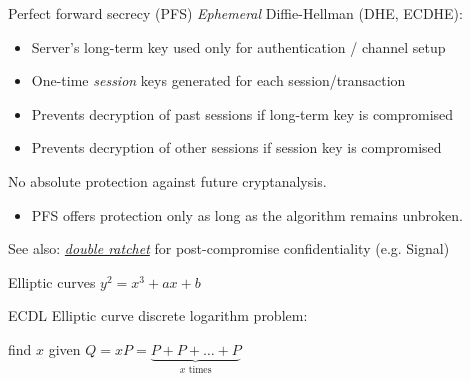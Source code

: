 \begin{frame}{Perfect forward secrecy (PFS)}
  \emph{Ephemeral} Diffie-Hellman (DHE, ECDHE):
  \begin{itemize}[<+(1)->]
    \item Server's long-term key used only for authentication / channel setup
    \item One-time \emph{session} keys generated for each session/transaction
    \item Prevents decryption of past sessions if  long-term key is compromised
    \item Prevents decryption of other sessions if session key is compromised
  \end{itemize}

  \pause
  No absolute protection against future cryptanalysis.
  \begin{itemize}
    \item PFS offers protection only as long as the algorithm remains unbroken.
  \end{itemize}

  \pause
  See also: \emph{\href{https://en.wikipedia.org/wiki/Double_Ratchet_Algorithm}{double ratchet}} for post-compromise confidentiality (e.g. Signal)
\end{frame}

\begin{frame}{Elliptic curves}
  $y^2 = x^3 + ax + b$
  \vspace*{-2em}
  \begin{center}
  \end{center}
\end{frame}

\begin{frame}{ECDL}
  Elliptic curve discrete logarithm problem:
  \begin{center}
    find $x$ given $Q = xP = \underbrace{P + P + \dots + P}_{x \text{ times}}$
  \end{center}
\end{frame}

